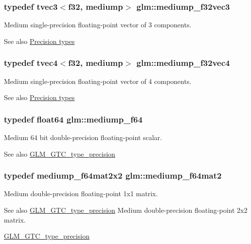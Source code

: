 \subsubsection[{mediump\+\_\+f32vec3}]{\setlength{\rightskip}{0pt plus 5cm}typedef tvec3$<${\bf f32}, mediump$>$ {\bf glm\+::mediump\+\_\+f32vec3}}\label{namespaceglm_a847e98e715459420de18bff43cbc49f6}
Medium single-\/precision floating-\/point vector of 3 components. \begin{DoxySeeAlso}{See also}
\hyperlink{group__core__precision}{Precision types} 
\end{DoxySeeAlso}
\hypertarget{namespaceglm_ae6f5c8dc9aed588de6a4abe14802e161}{}
\subsubsection[{mediump\+\_\+f32vec4}]{\setlength{\rightskip}{0pt plus 5cm}typedef tvec4$<${\bf f32}, mediump$>$ {\bf glm\+::mediump\+\_\+f32vec4}}\label{namespaceglm_ae6f5c8dc9aed588de6a4abe14802e161}
Medium single-\/precision floating-\/point vector of 4 components. \begin{DoxySeeAlso}{See also}
\hyperlink{group__core__precision}{Precision types} 
\end{DoxySeeAlso}
\hypertarget{namespaceglm_abd273bd38ea5e013aeec9ffd2b2591fb}{}
\subsubsection[{mediump\+\_\+f64}]{\setlength{\rightskip}{0pt plus 5cm}typedef {\bf float64} {\bf glm\+::mediump\+\_\+f64}}\label{namespaceglm_abd273bd38ea5e013aeec9ffd2b2591fb}
Medium 64 bit double-\/precision floating-\/point scalar. \begin{DoxySeeAlso}{See also}
\hyperlink{group__gtc__type__precision}{G\+L\+M\+\_\+\+G\+T\+C\+\_\+type\+\_\+precision} 
\end{DoxySeeAlso}
\hypertarget{namespaceglm_aa7eac0340d2aaf670ec4dfbd1826fd35}{}
\subsubsection[{mediump\+\_\+f64mat2}]{\setlength{\rightskip}{0pt plus 5cm}typedef {\bf mediump\+\_\+f64mat2x2} {\bf glm\+::mediump\+\_\+f64mat2}}\label{namespaceglm_aa7eac0340d2aaf670ec4dfbd1826fd35}
Medium double-\/precision floating-\/point 1x1 matrix. \begin{DoxySeeAlso}{See also}
\hyperlink{group__gtc__type__precision}{G\+L\+M\+\_\+\+G\+T\+C\+\_\+type\+\_\+precision} Medium double-\/precision floating-\/point 2x2 matrix. 

\hyperlink{group__gtc__type__precision}{G\+L\+M\+\_\+\+G\+T\+C\+\_\+type\+\_\+precision} 
\end{DoxySeeAlso}
\hypertarget{namespaceglm_adc818b8045259f2f2e33e735a9737dae}{}
